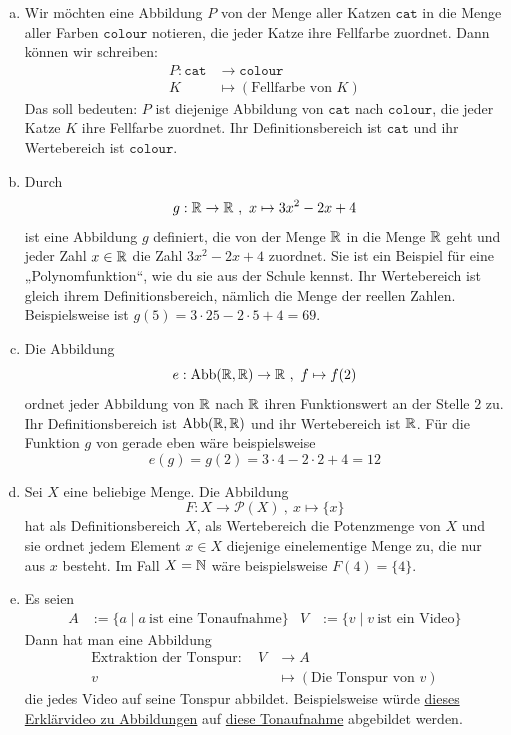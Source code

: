 \begin{bsp}
 \begin{enumerate}[a)]
  \item Wir möchten eine Abbildung $P$ von der Menge aller Katzen $\mathtt{cat}$ in die Menge aller Farben $\mathtt{colour}$ notieren, die jeder Katze ihre Fellfarbe zuordnet.
Dann können wir schreiben:
\begin{align*}
	P: \mathtt{cat} &\to \mathtt{colour} \\
	K &\mapsto (\text{Fellfarbe von } K)
\end{align*}
Das soll bedeuten: $P$ ist diejenige Abbildung von $\mathtt{cat}$ nach $\mathtt{colour}$, die jeder Katze $K$ ihre Fellfarbe zuordnet. Ihr Definitionsbereich ist $\mathtt{cat}$ und ihr Wertebereich ist $\mathtt{colour}$.
\item Durch
\[ g : {\mathbb R} \to {\mathbb R}\ , \ x \mapsto 3x^2-2x+4 \]
ist eine Abbildung $g$ definiert, die von der Menge ${\mathbb R}$ in die Menge ${\mathbb R}$ geht und jeder Zahl $x\in {\mathbb R}$ die Zahl $3x^2-2x+4$ zuordnet. Sie ist ein Beispiel für eine „Polynomfunktion“, wie du sie aus der Schule kennst. Ihr Wertebereich ist gleich ihrem Definitionsbereich, nämlich die Menge der reellen Zahlen. Beispielsweise ist $g(5) = 3\cdot 25 - 2\cdot 5 + 4 = 69$.
\item Die Abbildung
\[ e : \text{Abb}({\mathbb R},{\mathbb R}) \to {\mathbb R} \ ,\ f \mapsto f(2) \]
ordnet jeder Abbildung von ${\mathbb R}$ nach ${\mathbb R}$ ihren Funktionswert an der Stelle $2$ zu. Ihr Definitionsbereich ist $\text{Abb}({\mathbb R},{\mathbb R})$ und ihr Wertebereich ist ${\mathbb R}$. Für die Funktion $g$ von gerade eben wäre beispielsweise
\[ e(g) = g(2) = 3\cdot 4  - 2\cdot 2  + 4=12 \]
\item Sei $X$ eine beliebige Menge. Die Abbildung
\[ F: X \to \mathcal{P}(X) \ ,\ x \mapsto \{x\} \]
hat als Definitionsbereich $X$, als Wertebereich die Potenzmenge von $X$ und sie ordnet jedem Element $x \in X$ diejenige einelementige Menge zu, die nur aus $x$ besteht. Im Fall $X={\mathbb N}$ wäre beispielsweise $F(4) = \{4\}$.
\item Es seien
\begin{align*}
 A & := \{ a \mid a\ \text{ist eine Tonaufnahme} \} & V & := \{v\mid v \ \text{ist ein Video} \}
\end{align*}
Dann hat man eine Abbildung
\begin{align*}
\text{Extraktion der Tonspur} :\quad V&\to A \\
v & \mapsto (\text{Die Tonspur von $v$})
\end{align*}
die jedes Video auf seine Tonspur abbildet. Beispielsweise würde \href{https://www.youtube.com/watch?v=dQw4w9WgXcQ}{dieses Erklärvideo zu Abbildungen} auf \href{https://archive.org/details/NeverGonnaGiveYouUp}{diese Tonaufnahme} abgebildet werden.
 \end{enumerate}
\end{bsp}


